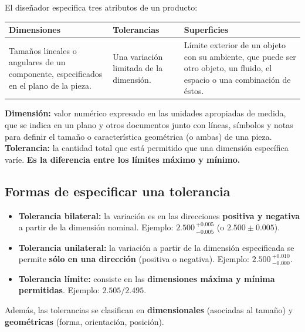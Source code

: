 \documentclass[12pt,a4paper]{article}
\begin{document}
El diseñador especifica tres atributos de un producto:
\begin{center}
	\begin{tabular}{@{}p{5cm}p{5cm}p{5cm}@{}}
		\toprule
		\textbf{Dimensiones} & \textbf{Tolerancias}                    &
		\textbf{Superficies}
		\\
		\midrule
		Tamaños lineales o angulares de un componente, especificados en el plano de
		la
		pieza.               & Una variación limitada de la dimensión. & Límite
		exterior de un objeto
		con su ambiente, que puede ser otro objeto, un fluido, el espacio o una
		combinación de éstos.                                                   \\
		\bottomrule
	\end{tabular}
\end{center}

\begin{defi}
	\textbf{Dimensión:} valor numérico expresado en las unidades apropiadas de
	medida, que se indica en un plano y otros documentos junto con líneas,
	símbolos
	y notas para definir el tamaño o característica geométrica (o ambas) de una
	pieza.\\[3pt]
	\textbf{Tolerancia:} la cantidad total que está permitido que una dimensión
	específica varíe. \textbf{Es la diferencia entre los límites máximo y mínimo.}
\end{defi}

\subsection{Formas de especificar una tolerancia}
\begin{itemize}
	\item \textbf{Tolerancia bilateral:} la variación es en las direcciones
	      \textbf{positiva y negativa} a partir de la dimensión nominal. Ejemplo:
	      $2.500\,^{+0.005}_{-0.005}$ (o $2.500 \pm 0.005$).
	\item \textbf{Tolerancia unilateral:} la variación a partir de la dimensión
	      especificada se permite \textbf{sólo en una dirección} (positiva o
	      negativa).
	      Ejemplo: $2.500\,^{+0.010}_{-0.000}$.
	\item \textbf{Tolerancia límite:} consiste en las \textbf{dimensiones máxima y
		      mínima permitidas}. Ejemplo: $2.505 / 2.495$.
\end{itemize}

Además, las tolerancias se clasifican en \textbf{dimensionales} (asociadas al
tamaño) y \textbf{geométricas} (forma, orientación, posición).
\end{document}

